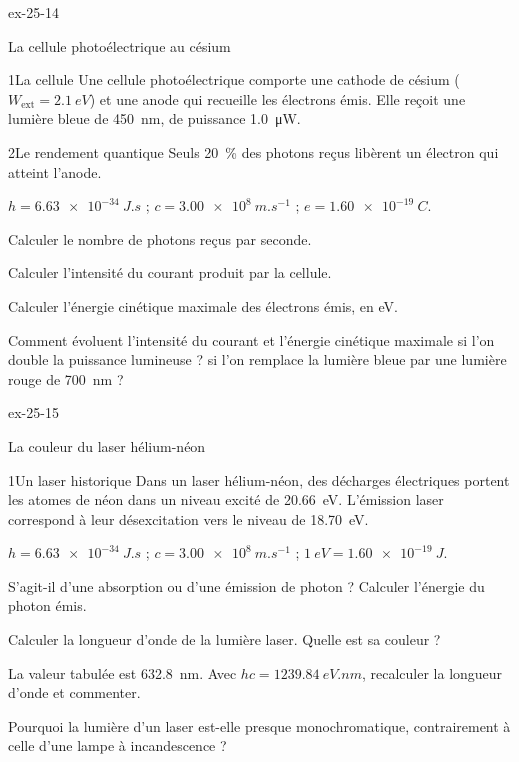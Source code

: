 \begin{blocLivre}{ex-25-14}
\begin{exercice}[3]{La cellule photoélectrique au césium}
\begin{docu}{1}{La cellule}
Une cellule photoélectrique comporte une cathode de césium ($W_\mathrm{ext}=\qty{2,1}{eV}$) et une anode qui recueille les
électrons émis. Elle reçoit une lumière bleue de \qty{450}{nm}, de puissance \qty{1,0}{\micro W}.
\end{docu}
\begin{docu}{2}{Le rendement quantique}
Seuls 20~\% des photons reçus libèrent un électron qui atteint l'anode.
\end{docu}
\begin{donnees}
$h=\qty{6,63e-34}{J.s}$ ; $c=\qty{3,00e8}{m.s^{-1}}$ ; $e=\qty{1,60e-19}{C}$.
\end{donnees}
\begin{questions}
\item Calculer le nombre de photons reçus par seconde.
\item \initiative Calculer l'intensité du courant produit par la cellule.
\item Calculer l'énergie cinétique maximale des électrons émis, en eV.
\item Comment évoluent l'intensité du courant et l'énergie cinétique maximale si l'on double la puissance lumineuse ? si
l'on remplace la lumière bleue par une lumière rouge de \qty{700}{nm} ?
\end{questions}
\end{exercice}
\end{blocLivre}
\begin{blocLivre}{ex-25-15}
\begin{exercice}[3]{La couleur du laser hélium-néon}
\begin{docu}{1}{Un laser historique}
Dans un laser hélium-néon, des décharges électriques portent les atomes de néon dans un niveau excité de \qty{20,66}{eV}.
L'émission laser correspond à leur désexcitation vers le niveau de \qty{18,70}{eV}.
\end{docu}
\begin{donnees}
$h=\qty{6,63e-34}{J.s}$ ; $c=\qty{3,00e8}{m.s^{-1}}$ ; $\qty{1}{eV}=\qty{1,60e-19}{J}$.
\end{donnees}
\begin{questions}
\item S'agit-il d'une absorption ou d'une émission de photon ? Calculer l'énergie du photon émis.
\item \initiative Calculer la longueur d'onde de la lumière laser. Quelle est sa couleur ?
\item La valeur tabulée est \qty{632,8}{nm}. Avec $hc=\qty{1239,84}{eV.nm}$, recalculer la longueur d'onde et commenter.
\item Pourquoi la lumière d'un laser est-elle presque monochromatique, contrairement à celle d'une lampe à
incandescence ?
\end{questions}
\end{exercice}
\end{blocLivre}
